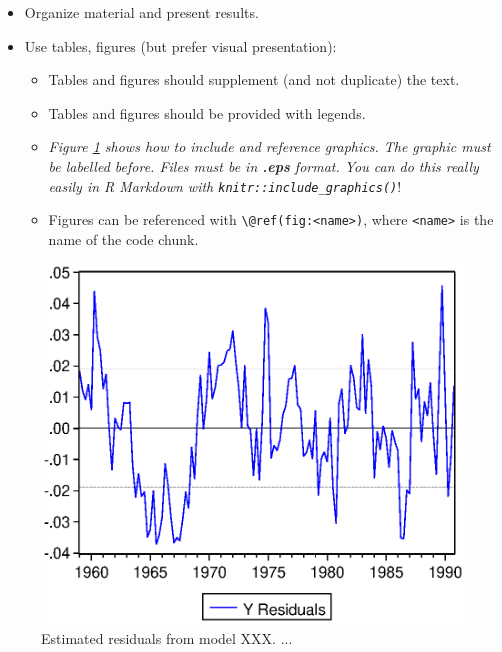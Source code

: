 \documentclass[a4paper,11pt]{article}
\begin{document}
\begin{itemize}
\item
  Organize material and present results.
\item
  Use tables, figures (but prefer visual presentation):
  \begin{itemize}
  \item
    Tables and figures should supplement (and not duplicate) the text.
  \item
    Tables and figures should be provided with legends.
  \item
    \emph{Figure \ref{fig:graph} shows how to include and reference graphics.
    The graphic must be labelled before. Files must be in \textbf{.eps} format. You
    can do this really easily in R Markdown with \texttt{knitr::include\_graphics()}}!
  \item
    Figures can be referenced with \texttt{\textbackslash{}@ref(fig:\textless{}name\textgreater{})}, where \texttt{\textless{}name\textgreater{}} is the
    name of the code chunk.
  \end{itemize}
\end{itemize}
\begin{figure}

{\centering \includegraphics[width=0.5\linewidth]{figures/graph} 

}

\caption{Estimated residuals from model XXX. ...}\label{fig:graph}
\end{figure}
\end{document}
